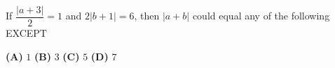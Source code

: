If $\dfrac{|a+3|}{2}=1$ and $2|b+1|=6$, then $|a+b|$ could equal any of the following EXCEPT

\textbf{(A)} $1$ \qquad \textbf{(B)} $3$ \qquad \textbf{(C)} $5$ \qquad \textbf{(D)} $7$
